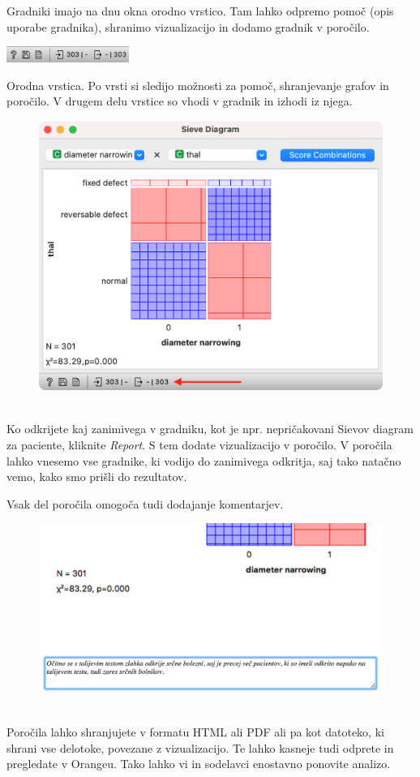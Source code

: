 \newpage

Gradniki imajo na dnu okna orodno vrstico. Tam lahko odpremo pomoč (opis uporabe gradnika), shranimo vizualizacijo in dodamo gradnik v poročilo.

\begin{marginfigure}
    \centering
    \includegraphics[width=40mm]{status-bar2.png}
    \caption{Orodna vrstica. Po vrsti si sledijo možnosti za pomoč, shranjevanje grafov in poročilo. V drugem delu vrstice so vhodi v gradnik in izhodi iz njega.}
    \label{fig:status-bar2}
\end{marginfigure}

\begin{figure}[h]
    \centering
    \includegraphics[width=\linewidth]{status-bar.png}%
    \caption{$\;$}
    \label{fig:status-bar}
\end{figure}

Ko odkrijete kaj zanimivega v gradniku, kot je npr. nepričakovani Sievov diagram za paciente, kliknite \textit{Report}. S tem dodate vizualizacijo v poročilo. V poročila lahko vnesemo vse gradnike, ki vodijo do zanimivega odkritja, saj tako natačno vemo, kako smo prišli do rezultatov.

Vsak del poročila omogoča tudi dodajanje komentarjev.

\begin{figure}[h]
    \centering
    \includegraphics[width=\linewidth]{report-comment.png}%
    \caption{$\;$}
    \label{fig:report-comment}
\end{figure}

Poročila lahko shranjujete v formatu HTML ali PDF ali pa kot datoteko, ki shrani vse delotoke, povezane z vizualizacijo. Te lahko kasneje tudi odprete in pregledate v Orangeu. Tako lahko vi in sodelavci enostavno ponovite analizo.
